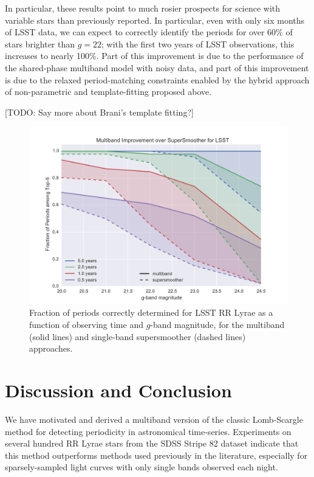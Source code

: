 \documentclass[12pt,preprint]{aastex}
\newcommand{\todo}[1]{{\color{red} [TODO: #1]}}
\newcommand{\figlabel}[1]{\label{fig:#1}}
\newcommand{\sectlabel}[1]{\label{sect:#1}}
\begin{document}
In particular, these results point to much rosier prospects for science with variable stars than previously reported.
In particular, even with only six months of LSST data, we can expect to correctly identify the periods for over 60\% of stars brighter than $g=22$; with the first two years of LSST observations, this increases to nearly 100\%.
Part of this improvement is due to the performance of the shared-phase multiband model with noisy data, and part of this improvement is due to the relaxed period-matching constraints enabled by the hybrid approach of non-parametric and template-fitting proposed above.

\todo{Say more about Brani's template fitting?}

\begin{figure}
  \centering
  \includegraphics[width=\textwidth]{fig09.pdf}
  \caption{
    Fraction of periods correctly determined for LSST RR Lyrae as a function
    of observing time and $g$-band magnitude, for the multiband (solid lines)
    and single-band supersmoother (dashed lines) approaches.
  } 
  \figlabel{LSST_sims}
\end{figure}

\section{Discussion and Conclusion}
\sectlabel{discussion}

We have motivated and derived a multiband version of the classic Lomb-Scargle method for detecting periodicity in astronomical time-series.
 Experiments on several hundred RR Lyrae stars from the SDSS Stripe 82 dataset indicate that this method outperforms methods used previously in the literature, especially for sparsely-sampled light curves with only single bands observed each night.
\end{document}
